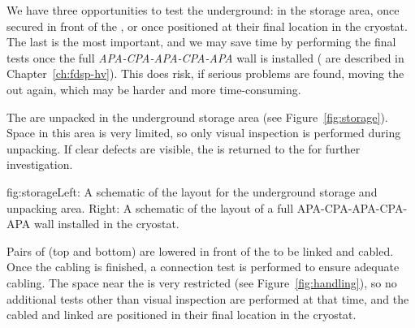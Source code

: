 We have three opportunities to test the  underground: in the storage area, once secured in front of the , or once positioned at their final location in the cryostat. The last is the most important, and we may save time by performing the final tests once the full \textit{APA-CPA-APA-CPA-APA} wall is installed ( are described in Chapter~\ref{ch:fdsp-hv}). This does risk, if serious problems are found, moving the  out again, which may be harder and more time-consuming.

The  are unpacked in the underground storage area (see Figure~\ref{fig:storage}). Space in this area is very limited, so only visual inspection is performed during unpacking. If clear defects are visible, the  is returned to the  for further investigation.

\begin{dunefigure}{fig:storage}{Left: A schematic of the layout for the underground storage and unpacking area. Right: A schematic of the layout of a full APA-CPA-APA-CPA-APA wall installed in the cryostat.}
\setlength{\fboxsep}{0pt}
\setlength{\fboxrule}{0.5pt}
\end{dunefigure}

Pairs of  (top and bottom) are lowered in front of the  to be linked and cabled. Once the cabling is finished, a connection test is performed to ensure adequate cabling. The space near the  is very restricted (see Figure~\ref{fig:handling}), so no additional tests other than visual inspection are performed at that time, and the cabled and linked  are positioned in their final location in the cryostat.


